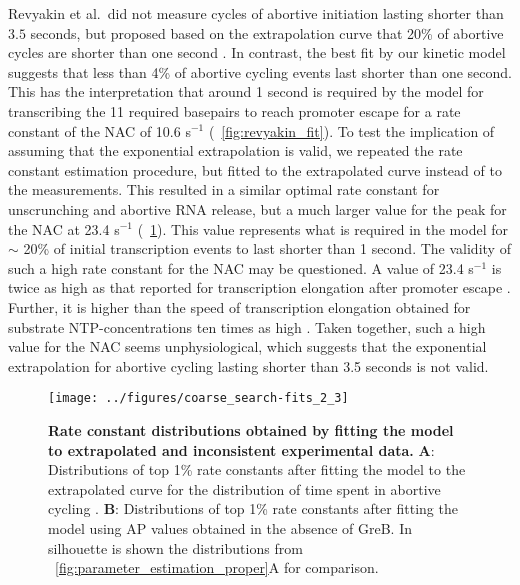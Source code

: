Revyakin et al.\ did not measure cycles of abortive initiation lasting shorter
than $3.5$ seconds, but proposed based on the extrapolation curve that 20\% of
abortive cycles are shorter than one second \cite{revyakin_abortive_2006}. In
contrast, the best fit by our kinetic model suggests that less than 4\% of
abortive cycling events last shorter than one second. This has the
interpretation that around 1 second is required by the model for transcribing the 11 required
basepairs to reach promoter escape for a rate constant of the NAC of 10.6
s$^{-1}$ (\FIG~\ref{fig:revyakin_fit}). To test the implication of assuming
that the exponential extrapolation is valid, we repeated the rate constant
estimation procedure, but fitted to the extrapolated curve instead of to the
measurements. This resulted in a similar optimal rate constant for
unscrunching and abortive RNA release, but a much larger value for the peak
for the NAC at 23.4 s$^{-1}$ (\FIG~\ref{fig:extrap_and_GreB_minus_fit}). This
value represents what is required in the model for $\sim$ 20\% of initial
transcription events to last shorter than 1 second. The validity of such a
high rate constant for the NAC may be questioned. A value of 23.4 s$^{-1}$ is
twice as high as that reported for transcription elongation after promoter
escape \cite{revyakin_abortive_2006}. Further, it is higher than the speed of
transcription elongation obtained for substrate NTP-concentrations ten times
as high \cite{bai_mechanochemical_2007}. Taken together, such a high value for
the NAC seems unphysiological, which suggests that the exponential
extrapolation for abortive cycling lasting shorter than 3.5 seconds is not
valid.

\begin{figure}[h]
    \begin{center}
      \texttt{[image: ../figures/coarse\_search-fits\_2\_3]}
    \end{center}
    \caption{
      {\bf Rate constant distributions obtained by fitting the model to
      extrapolated and inconsistent experimental data.} \textbf{A}:
      Distributions of top 1\% rate constants after fitting the model to the
      extrapolated curve for the distribution of time spent in abortive
      cycling \cite{revyakin_abortive_2006}. \textbf{B}: Distributions of top
      1\% rate constants after fitting the model using AP values obtained in the
      absence of GreB. In silhouette is shown the distributions from
      \FIG~\ref{fig:parameter_estimation_proper}A for comparison.}
      \label{fig:extrap_and_GreB_minus_fit}
\end{figure}

